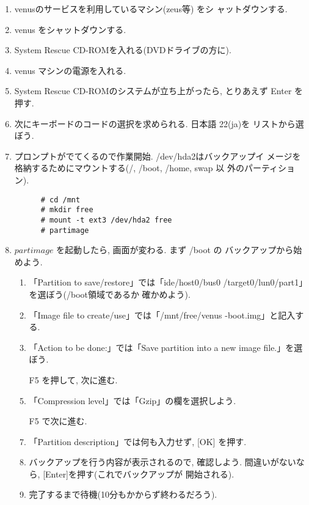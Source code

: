 \documentclass{jarticle}
\begin{document}
\begin{enumerate}
\item venusのサービスを利用しているマシン(zeus等) をシ
      ャットダウンする.
\item venus をシャットダウンする.
\item System Rescue CD-ROMを入れる(DVDドライブの方に).
\item venus マシンの電源を入れる.
\item System Rescue CD-ROMのシステムが立ち上がったら, とりあえず
      Enter を押す.
\item 次にキーボードのコードの選択を求められる. 日本語 22(ja)を
      リストから選ぼう.
\item プロンプトがでてくるので作業開始. /dev/hda2はバックアップイ
      メージを格納するためにマウントする(/, /boot, /home, swap 以
      外のパーティション).

      \begin{verbatim}
      # cd /mnt
      # mkdir free
      # mount -t ext3 /dev/hda2 free
      # partimage
      \end{verbatim}

\item $partimage$ を起動したら, 画面が変わる. まず /boot の
      バックアップから始めよう.

      \begin{enumerate}
      \item 「Partition to save/restore」では「ide/host0/bus0
             /target0/lun0/part1」を選ぼう(/boot領域であるか
             確かめよう).
      \item 「Image file to create/use」では「/mnt/free/venus
             -boot.img」と記入する.
      \item 「Action to be done:」では「Save partition into a
             new image file.」を選ぼう.
      \item [F5]を押して, 次に進む.
      \item 「Compression level」では「Gzip」の欄を選択しよう.
      \item [F5]で次に進む.
      \item 「Partition description」では何も入力せず, [OK]
            を押す.
      \item バックアップを行う内容が表示されるので, 確認しよう.
            間違いがないなら, [Enter]を押す(これでバックアップが
            開始される).
      \item 完了するまで待機(10分もかからず終わるだろう).
      \end{enumerate}


\end{enumerate}
\end{document}
